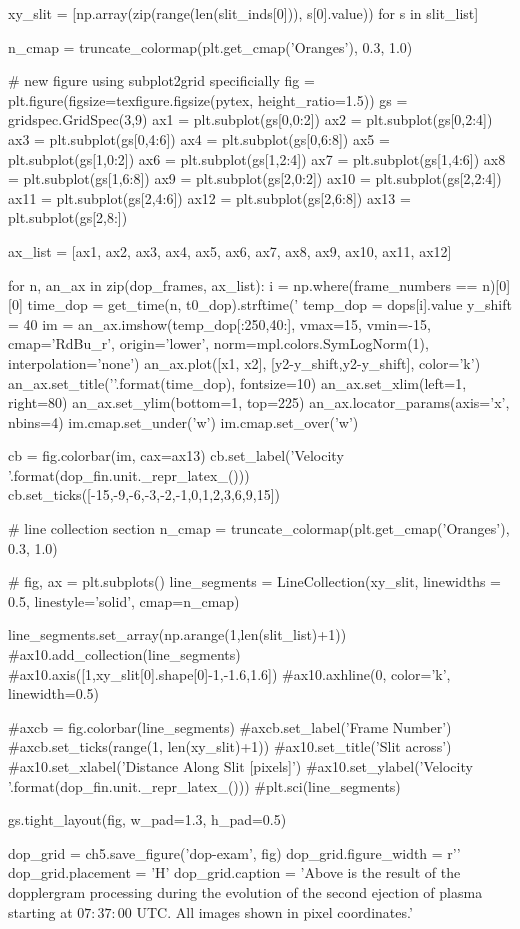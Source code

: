 \begin{pycode}[chapter5]
xy_slit = [np.array(zip(range(len(slit_inds[0])), s[0].value)) for s in slit_list]


n_cmap = truncate_colormap(plt.get_cmap('Oranges'), 0.3, 1.0)


# new figure using subplot2grid specificially
fig = plt.figure(figsize=texfigure.figsize(pytex, height_ratio=1.5))
gs = gridspec.GridSpec(3,9)
ax1 = plt.subplot(gs[0,0:2])
ax2 = plt.subplot(gs[0,2:4])
ax3 = plt.subplot(gs[0,4:6])
ax4 = plt.subplot(gs[0,6:8])
ax5 = plt.subplot(gs[1,0:2])
ax6 = plt.subplot(gs[1,2:4])
ax7 = plt.subplot(gs[1,4:6])
ax8 = plt.subplot(gs[1,6:8])
ax9 = plt.subplot(gs[2,0:2])
ax10 = plt.subplot(gs[2,2:4])
ax11 = plt.subplot(gs[2,4:6])
ax12 = plt.subplot(gs[2,6:8])
ax13 = plt.subplot(gs[2,8:])

ax_list = [ax1, ax2, ax3, ax4, ax5, ax6,
		   ax7, ax8, ax9, ax10, ax11, ax12]

for n, an_ax in zip(dop_frames, ax_list):
	i = np.where(frame_numbers == n)[0][0]
	time_dop = get_time(n, t0_dop).strftime('%
	temp_dop = dops[i].value
	y_shift = 40
	im = an_ax.imshow(temp_dop[:250,40:], vmax=15, vmin=-15,
	cmap='RdBu_r', origin='lower',
	norm=mpl.colors.SymLogNorm(1),
	interpolation='none')
	an_ax.plot([x1, x2], [y2-y_shift,y2-y_shift], color='k')
	an_ax.set_title('{}'.format(time_dop), fontsize=10)
	an_ax.set_xlim(left=1, right=80)
	an_ax.set_ylim(bottom=1, top=225)
	an_ax.locator_params(axis='x', nbins=4)
	im.cmap.set_under('w')
	im.cmap.set_over('w')

cb = fig.colorbar(im, cax=ax13)
cb.set_label('Velocity {}'.format(dop_fin.unit._repr_latex_()))
cb.set_ticks([-15,-9,-6,-3,-2,-1,0,1,2,3,6,9,15])

# line collection section
n_cmap = truncate_colormap(plt.get_cmap('Oranges'), 0.3, 1.0)

# fig, ax = plt.subplots()
line_segments = LineCollection(xy_slit,
							   linewidths = 0.5,
							   linestyle='solid',
							   cmap=n_cmap)
							   
line_segments.set_array(np.arange(1,len(slit_list)+1))
#ax10.add_collection(line_segments)
#ax10.axis([1,xy_slit[0].shape[0]-1,-1.6,1.6])
#ax10.axhline(0, color='k', linewidth=0.5)

#axcb = fig.colorbar(line_segments)
#axcb.set_label('Frame Number')
#axcb.set_ticks(range(1, len(xy_slit)+1))
#ax10.set_title('Slit across')
#ax10.set_xlabel('Distance Along Slit [pixels]')
#ax10.set_ylabel('Velocity {}'.format(dop_fin.unit._repr_latex_()))
#plt.sci(line_segments)

gs.tight_layout(fig, w_pad=1.3, h_pad=0.5)

dop_grid = ch5.save_figure('dop-exam', fig)
dop_grid.figure_width = r'\textwidth'
dop_grid.placement = 'H'
dop_grid.caption = 'Above is the result of the dopplergram processing during the evolution of the second ejection of plasma starting at $07:37:00$ UTC. All images shown in pixel coordinates.'


\end{pycode}

